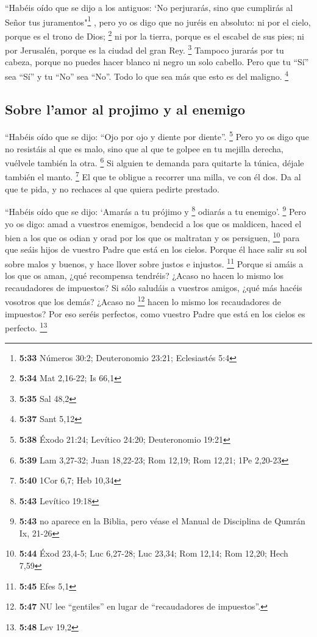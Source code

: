  ``Habéis oído que se dijo a los antiguos: `No
perjurarás, sino que cumplirás al Señor tus juramentos"\footnote{\textbf{5:33}
  Números 30:2; Deuteronomio 23:21; Eclesiastés 5:4} , 
pero yo os digo que no juréis en absoluto: ni por el cielo, porque es el
trono de Dios; \footnote{\textbf{5:34} Mat 2,16-22; Is 66,1}
 ni por la tierra, porque es el escabel de sus pies; ni
por Jerusalén, porque es la ciudad del gran Rey. \footnote{\textbf{5:35}
  Sal 48,2}  Tampoco jurarás por tu cabeza, porque no
puedes hacer blanco ni negro un solo cabello.  Pero que
tu ``Sí'' sea ``Sí'' y tu ``No'' sea ``No''. Todo lo que sea más que
esto es del maligno. \footnote{\textbf{5:37} Sant 5,12}

\hypertarget{sobre-lamor-al-projimo-y-al-enemigo}{%
\subsection{Sobre l'amor al projimo y al
enemigo}\label{sobre-lamor-al-projimo-y-al-enemigo}}

 ``Habéis oído que se dijo: ``Ojo por ojo y diente por
diente''. \footnote{\textbf{5:38} Éxodo 21:24; Levítico 24:20;
  Deuteronomio 19:21}  Pero yo os digo que no resistáis
al que es malo, sino que al que te golpee en tu mejilla derecha,
vuélvele también la otra. \footnote{\textbf{5:39} Lam 3,27-32; Juan
  18,22-23; Rom 12,19; Rom 12,21; 1Pe 2,20-23}  Si
alguien te demanda para quitarte la túnica, déjale también el manto.
\footnote{\textbf{5:40} 1Cor 6,7; Heb 10,34}  El que te
obligue a recorrer una milla, ve con él dos.  Da al que
te pida, y no rechaces al que quiera pedirte prestado.

 ``Habéis oído que se dijo: `Amarás a tu prójimo y
\footnote{\textbf{5:43} Levítico 19:18} odiarás a tu enemigo'.
\footnote{\textbf{5:43} no aparece en la Biblia, pero véase el Manual de
  Disciplina de Qumrán Ix, 21-26}  Pero yo os digo: amad
a vuestros enemigos, bendecid a los que os maldicen, haced el bien a los
que os odian y orad por los que os maltratan y os persiguen, \footnote{\textbf{5:44}
  Éxod 23,4-5; Luc 6,27-28; Luc 23,34; Rom 12,14; Rom 12,20; Hech 7,59}
 para que seáis hijos de vuestro Padre que está en los
cielos. Porque él hace salir su sol sobre malos y buenos, y hace llover
sobre justos e injustos. \footnote{\textbf{5:45} Efes 5,1}
 Porque si amáis a los que os aman, ¿qué recompensa
tendréis? ¿Acaso no hacen lo mismo los recaudadores de impuestos?
 Si sólo saludáis a vuestros amigos, ¿qué más hacéis
vosotros que los demás? ¿Acaso no \footnote{\textbf{5:47} NU lee
  ``gentiles'' en lugar de ``recaudadores de impuestos''.} hacen lo
mismo los recaudadores de impuestos?  Por eso seréis
perfectos, como vuestro Padre que está en los cielos es perfecto.
\footnote{\textbf{5:48} Lev 19,2}

